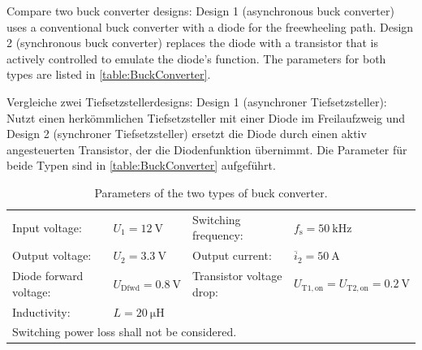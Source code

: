 

Compare two buck converter designs: Design 1 (asynchronous buck converter) uses a conventional buck converter with a diode for the freewheeling path. Design 2 (synchronous buck converter) replaces the diode with a transistor that is actively controlled to emulate the diode’s function. The parameters for both types are listed in \autoref{table:BuckConverter}.

\begin{germanblock}
	Vergleiche zwei Tiefsetzstellerdesigns: Design 1 (asynchroner Tiefsetzsteller): Nutzt einen herkömmlichen Tiefsetzsteller mit einer Diode im Freilaufzweig und Design 2 (synchroner Tiefsetzsteller) ersetzt die Diode durch einen aktiv angesteuerten Transistor, der die Diodenfunktion übernimmt. Die Parameter für beide Typen sind in	\autoref{table:BuckConverter}  aufgeführt.
\end{germanblock}



\begin{table}[ht]
	\centering  %
	\begin{tabular}{llll}
		\toprule
		Input voltage:         & $U_\mathrm{1} = \SI{12}{\volt}$     & Switching frequency:     & $f_\mathrm{s} = \SI{50}{\kilo\hertz}$                  \\
		Output voltage:        & $U_\mathrm{2} = \SI{3.3}{\volt}$    & Output current:          & $\overline{i}_\mathrm{2} = \SI{50}{\ampere}$           \\
		Diode forward voltage: & $U_\mathrm{Dfwd} = \SI{0.8}{\volt}$ & Transistor voltage drop: & $U_\mathrm{T1,on} = U_\mathrm{T2,on} =\SI{0.2}{\volt}$ \\
		Inductivity:           & $L = \SI{20}{\micro\henry}$         &                          &                                                        \\
		\midrule
		\multicolumn{4}{l}{\quad Switching power loss shall not be considered.}                                                                          \\
		\bottomrule
	\end{tabular}
	\caption{Parameters of the two types of buck converter.}  %
	\label{table:BuckConverter}
\end{table}

